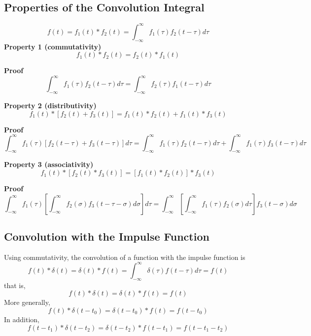\subsection{Properties of the Convolution Integral}
\begin{equation}
    f(t)=f_1(t)*f_2(t)=\int_{-\infty}^{\infty}f_1(\tau)f_2(t-\tau)d\tau
\end{equation}
\textbf{Property 1 (commutativity)}\\
\begin{equation}
    f_1(t)*f_2(t)=f_2(t)*f_1(t)
\end{equation}
\begin{note}
\textbf{Proof}
\begin{equation*}
    \int_{-\infty}^{\infty}f_1(\tau)f_2(t-\tau)d\tau = \int_{-\infty}^{\infty}f_2(\tau)f_1(t-\tau)d\tau
\end{equation*}
\end{note}
\textbf{Property 2 (distributivity)}\\
\begin{equation}
    f_1(t)*[f_2(t)+f_3(t)]=f_1(t)*f_2(t)+f_1(t)*f_3(t)
\end{equation}
\begin{note}
\textbf{Proof}
\begin{equation*}
    \int_{-\infty}^{\infty}f_1(\tau)[f_2(t-\tau)+f_3(t-\tau)]d\tau = \int_{-\infty}^{\infty}f_1(\tau)f_2(t-\tau)d\tau + \int_{-\infty}^{\infty}f_1(\tau)f_3(t-\tau)d\tau
\end{equation*}
\end{note}
\textbf{Property 3 (associativity)}\\
\begin{equation}
    f_1(t)*[f_2(t)*f_3(t)]=[f_1(t)*f_2(t)]*f_3(t)
\end{equation}
\begin{note}
\textbf{Proof}
\begin{equation*}
    \int_{-\infty}^{\infty}f_1(\tau)[\int_{-\infty}^{\infty}f_2(\sigma)f_3(t-\tau-\sigma)d\sigma]d\tau = \int_{-\infty}^{\infty}[\int_{-\infty}^{\infty}f_1(\tau)f_2(\sigma)d\tau]f_3(t-\sigma)d\sigma
\end{equation*}
\end{note}

\subsection{Convolution with the Impulse Function}
Using commutativity, the convolution of a function with the impulse function is
\[
f(t)*\delta(t)=\delta(t)*f(t)=\int_{-\infty}^{\infty}\delta(\tau)f(t-\tau)d\tau=f(t)
\]
that is,
\[
f(t)*\delta(t)=\delta(t)*f(t)=f(t)
\]
More generally,
\[
f(t)*\delta(t-t_0)=\delta(t-t_0)*f(t)=f(t-t_0)
\]
In addition,
\[
f(t-t_1)*\delta(t-t_2)=\delta(t-t_2)*f(t-t_1)=f(t-t_1-t_2)
\]

